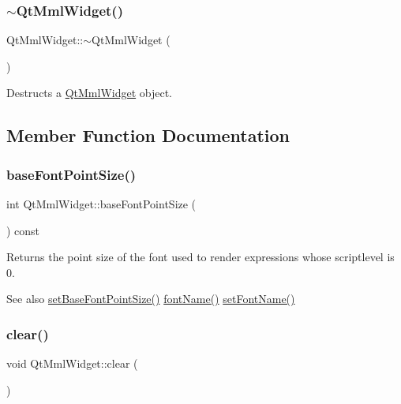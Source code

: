 \subsubsection{\texorpdfstring{$\sim$\+Qt\+Mml\+Widget()}{~QtMmlWidget()}}
{\footnotesize\ttfamily Qt\+Mml\+Widget\+::$\sim$\+Qt\+Mml\+Widget (\begin{DoxyParamCaption}{ }\end{DoxyParamCaption})}

Destructs a \mbox{\hyperlink{class_qt_mml_widget}{Qt\+Mml\+Widget}} object. 

\subsection{Member Function Documentation}
\mbox{\label{class_qt_mml_widget_ab255d9d35bca5f04d5828fabed87d5af}} 
\subsubsection{\texorpdfstring{base\+Font\+Point\+Size()}{baseFontPointSize()}}
{\footnotesize\ttfamily int Qt\+Mml\+Widget\+::base\+Font\+Point\+Size (\begin{DoxyParamCaption}{ }\end{DoxyParamCaption}) const}

Returns the point size of the font used to render expressions whose scriptlevel is 0.

\begin{DoxySeeAlso}{See also}
\mbox{\hyperlink{class_qt_mml_widget_ab13b093180da6bc6e9f928f4a02321a8}{set\+Base\+Font\+Point\+Size()}} \mbox{\hyperlink{class_qt_mml_widget_ab8a069c5d6a449e3d9d67e6b818172d9}{font\+Name()}} \mbox{\hyperlink{class_qt_mml_widget_afbc5b98c9d39c328270a9d65d58b0b7a}{set\+Font\+Name()}} 
\end{DoxySeeAlso}
\mbox{\label{class_qt_mml_widget_a96de78046ab6ea13c1e4dc4d0bae0bf9}} 
\subsubsection{\texorpdfstring{clear()}{clear()}}
{\footnotesize\ttfamily void Qt\+Mml\+Widget\+::clear (\begin{DoxyParamCaption}{ }\end{DoxyParamCaption})}

